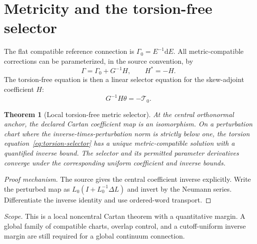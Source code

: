 \documentclass[11pt,a4paper,oneside]{book}
\theoremstyle{plain}
\newtheorem{theorem}{Theorem}[chapter]
\theoremstyle{definition}
\theoremstyle{remark}
\newcommand{\dd}{\mathrm d}
\newcommand{\src}[2]{\cite{#1}}
\newcommand{\scope}[1]{\par\smallskip\noindent\textit{Scope.} #1\par\smallskip}
\begin{document}
\section{Metricity and the torsion-free selector}
The flat compatible reference connection is $\Gamma_0=E^{-1}\dd E$. All metric-compatible corrections can be parameterized, in the source convention, by
\begin{equation}
 \Gamma=\Gamma_0+G^{-1}H,\qquad H^*=-H.
 \label{eq:metricity-param}
\end{equation}
The torsion-free equation is then a linear selector equation for the skew-adjoint coefficient $H$:
\begin{equation}
 G^{-1}H\theta=-\mathcal T_0.
 \label{eq:torsion-selector}
\end{equation}

\begin{theorem}[Local torsion-free metric selector]
\label{thm:torsion-selector}
At the central orthonormal anchor, the declared Cartan coefficient map is an isomorphism. On a perturbation chart where the inverse-times-perturbation norm is strictly below one, the torsion equation~\eqref{eq:torsion-selector} has a unique metric-compatible solution with a quantified inverse bound. The selector and its permitted parameter derivatives converge under the corresponding uniform coefficient and inverse bounds.
\end{theorem}
\begin{proof}[Proof mechanism]
The source gives the central coefficient inverse explicitly. Write the perturbed map as $L_0(I+L_0^{-1}\Delta L)$ and invert by the Neumann series. Differentiate the inverse identity and use ordered-word transport.
\end{proof}
\src{R13}{thm:v13v98-selector,thm:v13v99-cartan,prop:v13v99-isomorphism}
\scope{This is a local noncentral Cartan theorem with a quantitative margin. A global family of compatible charts, overlap control, and a cutoff-uniform inverse margin are still required for a global continuum connection.}
\end{document}
